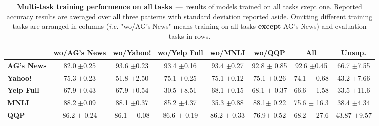 \begin{table*}[ht]
	\centering
	\fontsize{9}{13}
	\selectfont
	\begin{tabular*}{\textwidth}{l@{\extracolsep{\fill}}ccccccc}
		\toprule
		& \textbf{wo/AG's News} & \textbf{wo/Yahoo!} & \textbf{wo/Yelp Full} & \textbf{wo/MNLI} & \textbf{wo/QQP} & \textbf{All} & \textbf{Unsup.} \\
		\hline
		\textbf{AG's News}    & 82.0 \tiny$\pm$0.25        & 93.6 \tiny$\pm$0.23        & 93.4   \tiny$\pm$0.16          & 93.4 \tiny$\pm$0.27       & 92.8 \tiny$\pm$ 0.85 & 92.6 \tiny$\pm$0.45 & 66.7 \tiny$\pm$7.55 \\
		\textbf{Yahoo!}     & 75.3 \tiny$\pm$0.23        & 51.8 \tiny$\pm$2.50        & 75.1   \tiny$\pm$0.25          & 75.1 \tiny$\pm$0.12       & 75.1 \tiny$\pm$0.26 & 74.1 \tiny$\pm$ 0.68  & 43.2 \tiny$\pm$7.66 \\
		\textbf{Yelp Full} & 67.9 \tiny$\pm$0.43        & 67.9 \tiny$\pm$0.54        & 30.5   \tiny$\pm$8.51          & 68.1 \tiny$\pm$0.15       & 68.1 \tiny$\pm$ 0.37 & 66.6 \tiny$\pm$ 1.58 & 33.5 \tiny$\pm$11.6 \\
		\textbf{MNLI}      & 88.2 \tiny$\pm$0.09        & 88.1 \tiny$\pm$0.37        & 85.2   \tiny$\pm$4.37          & 35.3 \tiny$\pm$0.88      & 88.1\tiny$\pm$ 0.22  & 75.6 \tiny$\pm$ 16.3 & 38.4 \tiny$\pm$4.34 \\
		\textbf{QQP}      &  86.2 \tiny$\pm$ 0.24        &  86.1 \tiny$\pm$ 0.08        &    86.6 \tiny$\pm$ 0.19          &  86.2 \tiny$\pm$ 0.33      & 76.9\tiny$\pm$ 0.52  & 68.2 \tiny$\pm$ 27.6 & 43.87 \tiny$\pm$9.57\\
		\bottomrule
	\end{tabular*}
	\caption{\textbf{Multi-task training performence on all tasks}~---~results of models trained on all tasks exept one. Reported accuracy results are averaged over all three patterns with standard deviation reported aside. Omitting different training tasks are arranged in columns (\textit{i.e.} "wo/AG's News" means training on all tasks \textbf{except} AG's News) and evaluation tasks in rows.}\label{tab:multi-on-train-set-summary}
	\vspace{-4mm}
\end{table*}
